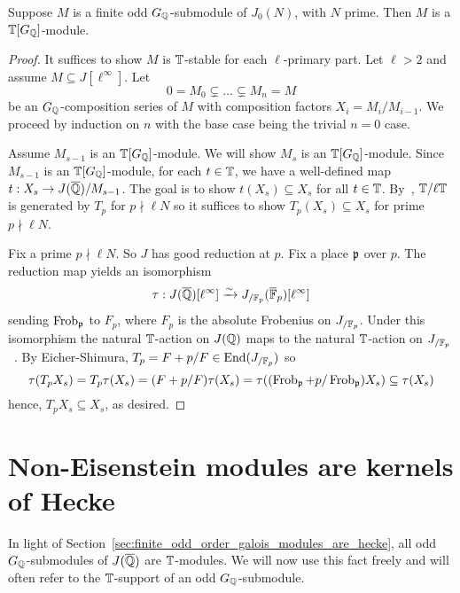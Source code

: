 \documentclass[11pt, proquest]{uwthesis}
\begin{document}
\begin{theorem}\label{thm:G_modules_are_Hecke}
    Suppose $M$ is a finite odd $G_{\mathbb{Q}}$-submodule of $J_0(N)$, with $N$ prime.
    Then $M$ is a $\mathbb{T}[G_{\mathbb{Q}}]$-module.
\end{theorem}
\begin{proof}
    It suffices to show $M$ is $\mathbb{T}$-stable for each $\ell$-primary part. Let
    $\ell>2$ and assume $M\subseteq J[\ell^\infty]$. Let
    \[
        0 = M_0 \subsetneq \ldots \subsetneq M_n = M
    \]
    be an $G_{\mathbb{Q}}$-composition series of $M$ with composition factors $X_i =
    M_i/M_{i-1}$. We proceed by induction on $n$ with the base
    case being the trivial $n=0$ case. 
    
    Assume $M_{s-1}$ is an $\mathbb{T}[G_{\mathbb{Q}}]$-module. We will show $M_s$ is an
    $\mathbb{T}[G_{\mathbb{Q}}]$-module. Since $M_{s-1}$ is an $\mathbb{T}[G_{\mathbb{Q}}]$-module, for each
    $t\in \mathbb{T}$, we have a well-defined map $t:X_s\to J(\overline{\mathbb{Q}})/M_{s-1}$. The
    goal is to show $t(X_s)\subseteq X_s$ for all $t\in \mathbb{T}$.
    By~\cite[Proposition 2]{ribet:mult_p_finite}, $\mathbb{T}/\ell \mathbb{T}$ is generated
    by $T_p$ for $p\nmid \ell N$ so it suffices to show $T_p(X_s)\subseteq X_s$
    for prime $p\nmid \ell N$.

    Fix a prime $p\nmid \ell N$. So $J$ has good reduction at $p$. Fix a place
    $\mathfrak{p}$ over $p$. The reduction map
    yields an isomorphism~\cite[Theorem 1, Lemma 2]{serre-tate}
    \[
        \tau:J(\overline{\mathbb{Q}})[\ell^\infty] \xrightarrow{\sim} J_{/\mathbb{F}_p} (\overline{\mathbb{F}}_p)[\ell^\infty]
    \]
    sending $\operatorname{Frob}_{\mathfrak{p}}$ to $F_p$, where $F_p$ is the absolute Frobenius on
    $J_{/\mathbb{F}_p}$. Under this isomorphism the natural $\mathbb{T}$-action on $J(\mathbb{Q})$
    maps to the natural $\mathbb{T}$-action on $J_{/\mathbb{F}_p}$~\cite[\S
    5.2]{ribet-stein:serre}. By Eicher-Shimura, $T_p = F+p/F\in
    \operatorname{End}(J_{/\mathbb{F}_p})$ so
    \[
    \tau(T_p X_s) 
    = T_p\tau(X_s) 
    = (F+p/F)\tau(X_s)
    = \tau((\operatorname{Frob}_{\mathfrak{p}}+p/\operatorname{Frob}_{\mathfrak{p}})X_s)
    \subseteq \tau(X_s)
    \]
    hence, $T_p X_s\subseteq X_s$, as desired.
\end{proof}


\section{Non-Eisenstein modules are kernels of Hecke}%
\label{sec:non_eisenstein_modules_are_kernels_of_hecke}

In light of Section~\ref{sec:finite_odd_order_galois_modules_are_hecke}, all
odd $G_{\mathbb{Q}}$-submodules of $J(\overline{\mathbb{Q}})$ are $\mathbb{T}$-modules. We will now
use this fact freely and will often refer to the $\mathbb{T}$-support of an odd
$G_{\mathbb{Q}}$-submodule.
\end{document}
